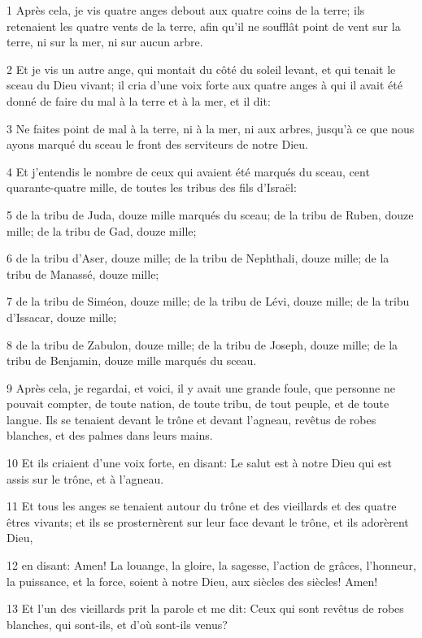 \par 1 Après cela, je vis quatre anges debout aux quatre coins de la terre; ils retenaient les quatre vents de la terre, afin qu'il ne soufflât point de vent sur la terre, ni sur la mer, ni sur aucun arbre.
\par 2 Et je vis un autre ange, qui montait du côté du soleil levant, et qui tenait le sceau du Dieu vivant; il cria d'une voix forte aux quatre anges à qui il avait été donné de faire du mal à la terre et à la mer, et il dit:
\par 3 Ne faites point de mal à la terre, ni à la mer, ni aux arbres, jusqu'à ce que nous ayons marqué du sceau le front des serviteurs de notre Dieu.
\par 4 Et j'entendis le nombre de ceux qui avaient été marqués du sceau, cent quarante-quatre mille, de toutes les tribus des fils d'Israël:
\par 5 de la tribu de Juda, douze mille marqués du sceau; de la tribu de Ruben, douze mille; de la tribu de Gad, douze mille;
\par 6 de la tribu d'Aser, douze mille; de la tribu de Nephthali, douze mille; de la tribu de Manassé, douze mille;
\par 7 de la tribu de Siméon, douze mille; de la tribu de Lévi, douze mille; de la tribu d'Issacar, douze mille;
\par 8 de la tribu de Zabulon, douze mille; de la tribu de Joseph, douze mille; de la tribu de Benjamin, douze mille marqués du sceau.
\par 9 Après cela, je regardai, et voici, il y avait une grande foule, que personne ne pouvait compter, de toute nation, de toute tribu, de tout peuple, et de toute langue. Ils se tenaient devant le trône et devant l'agneau, revêtus de robes blanches, et des palmes dans leurs mains.
\par 10 Et ils criaient d'une voix forte, en disant: Le salut est à notre Dieu qui est assis sur le trône, et à l'agneau.
\par 11 Et tous les anges se tenaient autour du trône et des vieillards et des quatre êtres vivants; et ils se prosternèrent sur leur face devant le trône, et ils adorèrent Dieu,
\par 12 en disant: Amen! La louange, la gloire, la sagesse, l'action de grâces, l'honneur, la puissance, et la force, soient à notre Dieu, aux siècles des siècles! Amen!
\par 13 Et l'un des vieillards prit la parole et me dit: Ceux qui sont revêtus de robes blanches, qui sont-ils, et d'où sont-ils venus?
